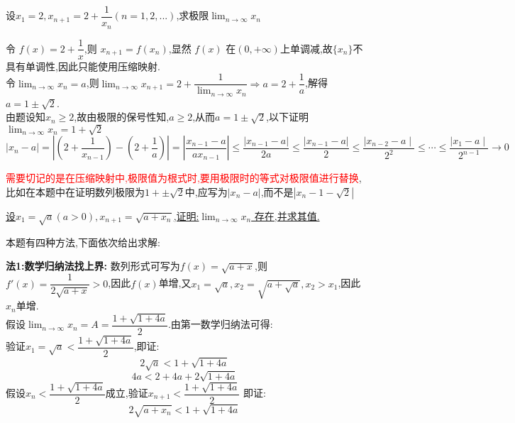 \documentclass[8pt a4paper, oneside, UTF8]{ctexbook}
\begin{document}
\begin{sloppypar}
\begin{note}
\begin{solution}
        \end{solution}
    \end{note}
    \begin{problem}
        设$x_1=2,x_{n+1}=2+\dfrac1{x_n}(n=1,2,...)$,求极限$\lim_{n\to\infty}x_n$
    \end{problem}
    \begin{solution}
        令 $f(x)=2+\dfrac1x$,则 $x_{n+1}=f(x_n)$,显然 $f(x)$ 在$(0,+\infty)$上单调减,故$\{x_n\}$不具有单调性,因此只能使用压缩映射.\\
        令$\lim_{n\to \infty}x_n=a$,则$\lim_{n \to \infty}x_{n+1}=2+\dfrac{1}{\lim_{n\to \infty}x_n} \Rightarrow a=2+\dfrac{1}{a}$,解得$a=1\pm \sqrt{2}$.\\
        由题设知$x_n\geq2$,故由极限的保号性知,$a\geq2$,从而$a=1 \pm \sqrt{2}$,以下证明$\lim_{n\to \infty}x_n=1+\sqrt{2}$\\
        $\mid x_n-a\mid=\left|\left(2+\dfrac{1}{x_{n-1}}\right)-\left(2+\dfrac{1}{a}\right)\right|=\left|\dfrac{x_{n-1}-a}{ax_{n-1}}\right|\leqslant\dfrac{\left|x_{n-1}-a\right|}{2a}\leqslant\dfrac{\left|x_{n-1}-a\right|}{2} \leqslant \dfrac{\mid x_{n-2}-a\mid}{2^2} \leqslant \cdots \leqslant \dfrac{\mid x_1-a\mid}{2^{n-1}}\to0$
    \end{solution}
    \begin{note}
        \textcolor{red}{需要切记的是在压缩映射中,极限值为根式时,要用极限时的等式对极限值进行替换},比如在本题中在证明数列极限为$1+\pm \sqrt{2}$中,应写为$|x_n -a|$,而不是$|x_n -1 -\sqrt{2}|$
    \end{note}
    \begin{problem}
        \uline{设$x_1=\sqrt{a}(a>0),x_{n+1}=\sqrt{a+x_n}$,证明:$\lim_{n\to\infty} x_n$ 存在,并求其值.}
    \end{problem}
        本题有四种方法,下面依次给出求解:
        \begin{solution}{\textbf{法1:数学归纳法找上界:}}
            数列形式可写为$f(x)=\sqrt{a+x}$,则$f'(x)=\dfrac{1}{2\sqrt{a+x}}>0$,因此$f(x)$单增,又$x_1=\sqrt{a},x_2=\sqrt{a+\sqrt{a}},x_2>x_1$,因此$x_n$单增.\\
            假设$\lim_{n\to \infty}x_n=A=\dfrac{1+\sqrt{1+4a}}{2}$.由第一数学归纳法可得:\\
            验证$x_1=\sqrt{a}<\dfrac{1+\sqrt{1+4a}}{2}$,即证:$$
                2\sqrt{a}<1+\sqrt{1+4a}
            $$
            $$
                4a<2+4a+2\sqrt{1+4a}
            $$
            假设$x_n<\dfrac{1+\sqrt{1+4a}}{2}$成立,验证$x_{n+1}<\dfrac{1+\sqrt{1+4a}}{2}$
            即证:$$
                2\sqrt{a+x_n}<1+\sqrt{1+4a}
$$
\end{solution}
\end{sloppypar}
\end{document}
